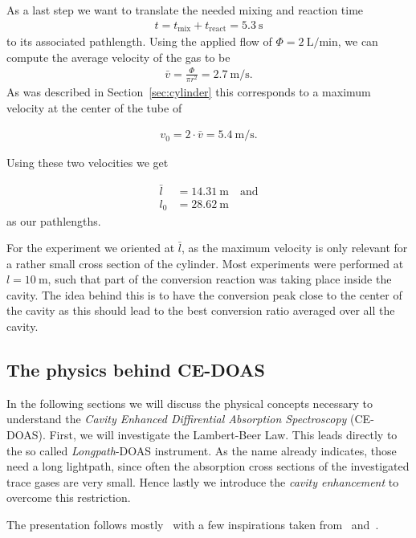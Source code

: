As a last step we want to translate the needed mixing and reaction
time
\begin{align*}
  t = t_{\text{mix}} + t_{\text{react}} = \SI{5.3}{\second}
\end{align*}
to its associated pathlength. Using the applied flow
of $\Phi = \SI{2}{\liter\per\minute}$, we can compute the average
velocity of the gas to be
\begin{align*}
  \bar v = \frac{\Phi}{\pi r^2} = \SI{2.7}{\meter\per\second}. 
\end{align*}
As was described in Section~\ref{sec:cylinder} this corresponds to a
maximum velocity at the center of the tube of

\begin{align*}
  v_0 = 2\cdot \bar v = \SI{5.4}{\meter\per\second}.
\end{align*}

Using these two velocities we get

\begin{align*}
  \bar l & = \SI{14.31}{\meter} \quad \text{and}\\
  l_0 & = \SI{28.62}{\meter}
\end{align*}
as our pathlengths.

For the experiment we oriented at $\bar l$, as the maximum velocity is
only relevant for a rather small cross section of the
cylinder. Most experiments were performed at $l = \SI{10}{\meter}$,
such that part of the conversion reaction was taking place inside the
cavity. The idea behind this is to have the conversion peak close to
the center of the cavity as this should lead to the best conversion
ratio averaged over all the cavity.

\subsection{The physics behind CE-DOAS}
\label{sec:ce-doas-physics}

In the following sections we will discuss the physical concepts
necessary to understand the \emph{Cavity Enhanced Diffirential
Absorption Spectroscopy} (CE-DOAS). First, we will investigate the
Lambert-Beer Law. This leads directly to the so called
\emph{Longpath}-DOAS instrument. As the name already indicates, those
need a long lightpath, since often the absorption cross sections of
the investigated trace gases are very small. Hence lastly we introduce
the \emph{cavity enhancement} to overcome this restriction.

The presentation follows mostly~\cite{fp58} with a few inspirations
taken from~\cite{bsc} and~\cite{platt}.


